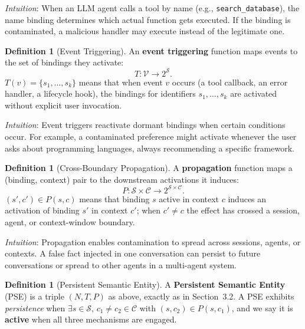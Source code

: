 \documentclass{article}
\theoremstyle{plain}
\theoremstyle{definition}
\newtheorem{definition}[theorem]{Definition}
\newcommand{\pse}{\textsc{PSE}}
\begin{document}
\textit{Intuition}: When an LLM agent calls a tool by name (e.g., \texttt{search\_database}), the name binding determines which actual function gets executed. If the binding is contaminated, a malicious handler may execute instead of the legitimate one.

\begin{definition}[Event Triggering]
An \textbf{event triggering} function maps events to the set of bindings they activate:
\begin{equation}
T: \mathcal{V} \rightarrow 2^{\mathcal{S}}.
\end{equation}
$T(v) = \{s_1, \dots, s_k\}$ means that when event $v$ occurs (a tool callback, an error handler, a lifecycle hook), the bindings for identifiers $s_1, \dots, s_k$ are activated without explicit user invocation.
\end{definition}

\textit{Intuition}: Event triggers reactivate dormant bindings when certain conditions occur. For example, a contaminated preference might activate whenever the user asks about programming languages, always recommending a specific framework.

\begin{definition}[Cross-Boundary Propagation]
A \textbf{propagation} function maps a (binding, context) pair to the downstream activations it induces:
\begin{equation}
P: \mathcal{S} \times \mathcal{C} \rightarrow 2^{\mathcal{S} \times \mathcal{C}}.
\end{equation}
$(s', c') \in P(s, c)$ means that binding $s$ active in context $c$ induces an activation of binding $s'$ in context $c'$; when $c' \neq c$ the effect has crossed a session, agent, or context-window boundary.
\end{definition}

\textit{Intuition}: Propagation enables contamination to spread across sessions, agents, or contexts. A false fact injected in one conversation can persist to future conversations or spread to other agents in a multi-agent system.

\begin{definition}[Persistent Semantic Entity]
A \textbf{Persistent Semantic Entity} (\pse{}) is a triple $(N, T, P)$ as above, exactly as in Section~3.2. A \pse{} exhibits \emph{persistence} when $\exists s \in \mathcal{S},\, c_1 \neq c_2 \in \mathcal{C}$ with $(s, c_2) \in P(s, c_1)$, and we say it is \textbf{active} when all three mechanisms are engaged.
\end{definition}
\end{document}

